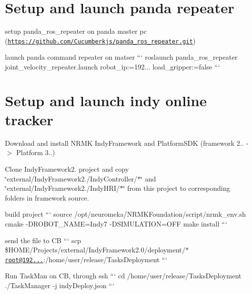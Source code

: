 \section*{Setup and launch panda repeater}


\begin{DoxyItemize}
\item setup panda\+\_\+ros\+\_\+repeater on panda master pc (\href{https://github.com/Cucumberkjs/panda_ros_repeater.git}{\tt https\+://github.\+com/\+Cucumberkjs/panda\+\_\+ros\+\_\+repeater.\+git})
\item launch panda command repeater on matser ``` roslaunch panda\+\_\+ros\+\_\+repeater joint\+\_\+velocity\+\_\+repeater.\+launch robot\+\_\+ip\+:=192... load\+\_\+gripper\+:=false ```
\end{DoxyItemize}

\section*{Setup and launch indy online tracker}


\begin{DoxyItemize}
\item Download and install N\+R\+MK Indy\+Framework and Platform\+S\+DK (framework 2.. -\/$>$ Platform 3..)
\item Clone Indy\+Framework2. project and copy \char`\"{}external/\+Indy\+Framework2./\+Indy\+Controller/$\ast$\char`\"{} and \char`\"{}external/\+Indy\+Framework2./\+Indy\+H\+R\+I/$\ast$\char`\"{} from this project to corresponding folders in framework source.
\item build project ``` source /opt/neuromeka/\+N\+R\+M\+K\+Foundation/script/nrmk\+\_\+env.sh cmake -\/\+D\+R\+O\+B\+O\+T\+\_\+\+N\+A\+ME=Indy7 -\/\+D\+S\+I\+M\+U\+L\+A\+T\+I\+ON=O\+FF make install ```
\item send the file to CB ``` scp \$\+H\+O\+ME/\+Projects/external/\+Indy\+Framework2.0/deployment/$\ast$ \href{mailto:root@192.168.0.63}{\tt root@192...}\+:/home/user/release/\+Tasks\+Deployment ```
\item Run Task\+Man on CB, through ssh ``` cd /home/user/release/\+Tasks\+Deployment ./\+Task\+Manager -\/j indy\+Deploy.\+json ``` 
\end{DoxyItemize}